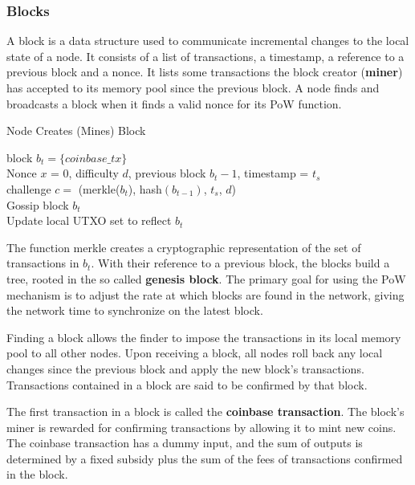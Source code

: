\subsubsection{Blocks}

A block is a data structure used to communicate incremental changes to the local state of a node. It consists of a list of transactions, a timestamp, a reference to a previous block and a nonce. It lists some transactions the block creator (\textbf{miner}) has accepted to its memory pool since the previous block. A node finds and broadcasts a block when it finds a valid nonce for its PoW function.\medskip

\begin{algorithm}[H]
\caption{Node Creates (Mines) Block}
	block $b_t = \{coinbase\_tx\}$ \\
	\BlankLine
	Nonce $x$ = 0, difficulty $d$, previous block $b_t−1$, timestamp = $t_s$ \\
	challenge $c = $ (merkle($b_t$), hash$(b_{t-1})$, $t_s$, $d$) \\
	Gossip block $b_t$ \\
	Update local UTXO set to reflect $b_t$
\end{algorithm}
\medskip

The function merkle creates a cryptographic representation of the set of transactions in $b_t$. With their reference to a previous block, the blocks build a tree, rooted in the so called \textbf{genesis block}. The primary goal for using the PoW mechanism is to adjust the rate at which blocks are found in the network, giving the network time to synchronize on the latest block. \medskip

Finding a block allows the finder to impose the transactions in its local memory pool to all other nodes. Upon receiving a block, all nodes roll back any local changes since the previous block and apply the new block's transactions. Transactions contained in a block are said to be confirmed by that block. \medskip

The first transaction in a block is called the \textbf{coinbase transaction}. The block's miner is rewarded for confirming transactions by allowing it to mint new coins. The coinbase transaction has a dummy input, and the sum of outputs is determined by a fixed subsidy plus the sum of the fees of transactions confirmed in the block.

